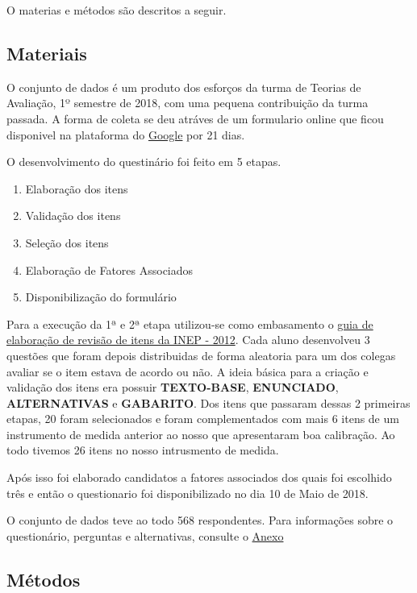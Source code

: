 \documentclass[]{article}
\providecommand{\tightlist}{%
  \setlength{\itemsep}{0pt}\setlength{\parskip}{0pt}}
\begin{document}
O materias e métodos são descritos a seguir.

\subsection{Materiais}\label{materiais}

O conjunto de dados é um produto dos esforços da turma de Teorias de
Avaliação, 1º semestre de 2018, com uma pequena contribuição da turma
passada. A forma de coleta se deu atráves de um formulario online que
ficou disponivel na plataforma do
\href{https://www.google.com/forms/about/}{Google} por 21 dias.

O desenvolvimento do questinário foi feito em 5 etapas.

\begin{enumerate}
\def\labelenumi{\arabic{enumi}.}
\tightlist
\item
  Elaboração dos itens
\item
  Validação dos itens
\item
  Seleção dos itens
\item
  Elaboração de Fatores Associados
\item
  Disponibilização do formulário
\end{enumerate}

Para a execução da 1ª e 2ª etapa utilizou-se como embasamento o
\href{www.ufpr.br/~aanjos/CE095/guia_elaboracao_revisao_itens_2012_INEP.pdf}{guia
de elaboração de revisão de itens da INEP - 2012}. Cada aluno
desenvolveu 3 questões que foram depois distribuidas de forma aleatoria
para um dos colegas avaliar se o item estava de acordo ou não. A ideia
básica para a criação e validação dos itens era possuir
\textbf{TEXTO-BASE}, \textbf{ENUNCIADO}, \textbf{ALTERNATIVAS} e
\textbf{GABARITO}. Dos itens que passaram dessas 2 primeiras etapas, 20
foram selecionados e foram complementados com mais 6 itens de um
instrumento de medida anterior ao nosso que apresentaram boa calibração.
Ao todo tivemos 26 itens no nosso intrusmento de medida.

Após isso foi elaborado candidatos a fatores associados dos quais foi
escolhido três e então o questionario foi disponibilizado no dia 10 de
Maio de 2018.

O conjunto de dados teve ao todo 568 respondentes. Para informações
sobre o questionário, perguntas e alternativas, consulte o
\protect\hyperlink{Anexo}{Anexo}

\subsection{Métodos}\label{metodos}
\end{document}
